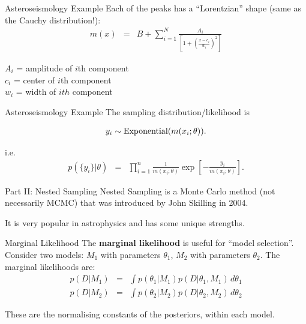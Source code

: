 \begin{frame}[t]{Asteroseismology Example}
Each of the peaks has a ``Lorentzian'' shape
(same as the Cauchy distribution!):
\begin{eqnarray}
m(x) &=& B + \sum_{i=1}^N \frac{A_i}
{\left[1 + \left(\frac{x - c_i}{w_i}\right)^2\right]} 
\end{eqnarray}

$A_i$ = amplitude of $i$th component\\
$c_i$ = center of $i$th component\\
$w_i$ = width of $ith$ component\\


\end{frame}

\begin{frame}[t]{Asteroseismology Example}
The sampling distribution/likelihood is

\begin{eqnarray*}
y_i \sim \textnormal{Exponential}(m(x_i; \theta)).
\end{eqnarray*}

i.e.
\begin{eqnarray*}
p(\{y_i\} | \theta) &=& \prod_{i=1}^n \frac{1}{m(x_i; \theta)}
\exp\left[-\frac{y_i}{m(x_i; \theta)}\right].
\end{eqnarray*}
\end{frame}



\begin{frame}[t]{Part II: Nested Sampling}
Nested Sampling is a Monte Carlo method (not necessarily MCMC) that was
introduced by John Skilling in 2004.

It is very popular in astrophysics and has some unique strengths.
\end{frame}


\begin{frame}[t]{Marginal Likelihood}
The {\bf marginal likelihood} is useful for ``model selection''. Consider
two models: $M_1$ with parameters $\theta_1$, $M_2$ with parameters $\theta_2$.
The marginal likelihoods are:
\begin{eqnarray*}
p(D | M_1) &=& \int p(\theta_1 | M_1) p(D | \theta_1, M_1) \, d\theta_1\\
p(D | M_2) &=& \int p(\theta_2 | M_2) p(D | \theta_2, M_2) \, d\theta_2
\end{eqnarray*}

These are the normalising constants of the posteriors, within each model.
\end{frame}




